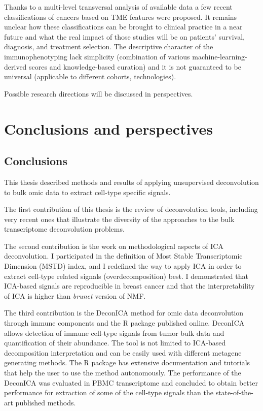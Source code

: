 \documentclass[12pt,]{book}
\theoremstyle{definition}
\theoremstyle{definition}
\theoremstyle{definition}
\theoremstyle{remark}
\begin{document}
Thanks to a multi-level transversal analysis of available data a few
recent classifications of cancers based on TME features were proposed.
It remains unclear how these classifications can be brought to clinical
practice in a near future and what the real impact of those studies will
be on patients' survival, diagnosis, and treatment selection. The
descriptive character of the immunophenotyping lack simplicity
(combination of various machine-learning-derived scores and
knowledge-based curation) and it is not guaranteed to be universal
(applicable to different cohorts, technologies).

Possible research directions will be discussed in perspectives.

\hypertarget{conclusions}{%
\chapter{Conclusions and perspectives}\label{conclusions}}

\hypertarget{conclusions-1}{%
\section{Conclusions}\label{conclusions-1}}

This thesis described methods and results of applying unsupervised
deconvolution to bulk omic data to extract cell-type specific signals.

The first contribution of this thesis is the review of deconvolution
tools, including very recent ones that illustrate the diversity of the
approaches to the bulk transcriptome deconvolution problems.

The second contribution is the work on methodological aspects of ICA
deconvolution. I participated in the definition of Most Stable
Transcriptomic Dimension (MSTD) index, and I redefined the way to apply
ICA in order to extract cell-type related signals (overdecomposition)
best. I demonstrated that ICA-based signals are reproducible in breast
cancer and that the interpretability of ICA is higher than \emph{brunet}
version of NMF.

The third contribution is the DeconICA method for omic data
deconvolution through immune components and the R package published
online. DeconICA allows detection of immune cell-type signals from tumor
bulk data and quantification of their abundance. The tool is not limited
to ICA-based decomposition interpretation and can be easily used with
different metagene generating methods. The R package has extensive
documentation and tutorials that help the user to use the method
autonomously. The performance of the DeconICA was evaluated in PBMC
transcriptome and concluded to obtain better performance for extraction
of some of the cell-type signals than the state-of-the-art published
methods.
\end{document}
